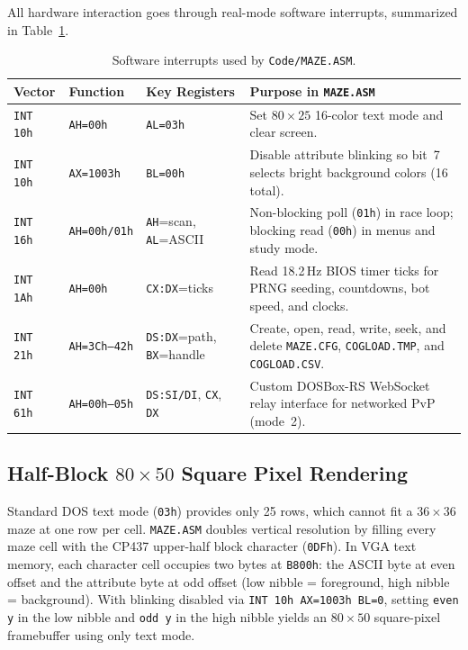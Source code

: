\documentclass[11pt,a4paper]{article}
\begin{document}
All hardware interaction goes through real-mode software interrupts, summarized in Table~\ref{tab:interrupts}.

\begin{table}[H]
    \centering
    \caption{Software interrupts used by \texttt{Code/MAZE.ASM}.}
    \label{tab:interrupts}
    \small
    \begin{tabular}{@{}lllp{6.4cm}@{}}
        \toprule
        \textbf{Vector} & \textbf{Function} & \textbf{Key Registers} & \textbf{Purpose in \texttt{MAZE.ASM}} \\
        \midrule
        \texttt{INT 10h} & \texttt{AH=00h} & \texttt{AL=03h} & Set $80\times 25$ 16-color text mode and clear screen. \\
        \texttt{INT 10h} & \texttt{AX=1003h} & \texttt{BL=00h} & Disable attribute blinking so bit~7 selects bright background colors (16 total). \\
        \texttt{INT 16h} & \texttt{AH=00h/01h} & \texttt{AH}=scan, \texttt{AL}=ASCII & Non-blocking poll (\texttt{01h}) in race loop; blocking read (\texttt{00h}) in menus and study mode. \\
        \texttt{INT 1Ah} & \texttt{AH=00h} & \texttt{CX:DX}=ticks & Read 18.2\,Hz BIOS timer ticks for PRNG seeding, countdowns, bot speed, and clocks. \\
        \texttt{INT 21h} & \texttt{AH=3Ch--42h} & \texttt{DS:DX}=path, \texttt{BX}=handle & Create, open, read, write, seek, and delete \texttt{MAZE.CFG}, \texttt{COGLOAD.TMP}, and \texttt{COGLOAD.CSV}. \\
        \texttt{INT 61h} & \texttt{AH=00h--05h} & \texttt{DS:SI/DI}, \texttt{CX}, \texttt{DX} & Custom DOSBox-RS WebSocket relay interface for networked PvP (mode~2). \\
        \bottomrule
    \end{tabular}
\end{table}

\subsection{Half-Block \texorpdfstring{$80\times 50$}{80x50} Square Pixel Rendering}
Standard DOS text mode (\texttt{03h}) provides only 25 rows, which cannot fit a $36\times 36$ maze at one row per cell. \texttt{MAZE.ASM} doubles vertical resolution by filling every maze cell with the CP437 upper-half block character (\texttt{0DFh}). In VGA text memory, each character cell occupies two bytes at \texttt{B800h}: the ASCII byte at even offset and the attribute byte at odd offset (low nibble = foreground, high nibble = background). With blinking disabled via \texttt{INT 10h AX=1003h BL=0}, setting \texttt{even y} in the low nibble and \texttt{odd y} in the high nibble yields an $80\times 50$ square-pixel framebuffer using only text mode.
\end{document}
